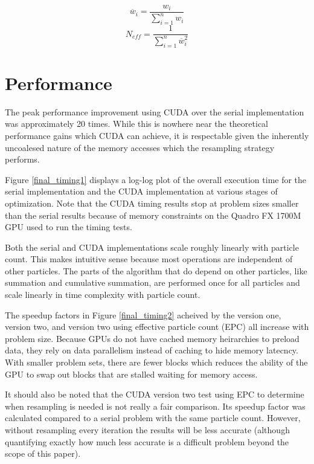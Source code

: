 \documentclass{article}
\begin{document}
\[\overline{w}_{i} = \frac{w_{i}}{\sum_{i=1}^{n} w_{i}}\]
\begin{equation}\label{epc}
N_{eff} = \frac{1}{\sum_{i=1}^{n} \overline{w}_{i}^2}
\end{equation}

\section{Performance}
The peak performance improvement using CUDA over the serial implementation was approximately 20 times. While this is nowhere near the theoretical performance gains which CUDA can achieve, it is respectable given the inherently uncoalesed nature of the memory accesses which the resampling strategy performs.

Figure \ref{final_timing1} displays a log-log plot of the overall execution time for the serial implementation and the CUDA implementation at various stages of optimization. Note that the CUDA timing results stop at problem sizes smaller than the serial results because of memory constraints on the Quadro FX 1700M GPU used to run the timing tests.

Both the serial and CUDA implementations scale roughly linearly with particle count. This makes intuitive sense because most operations are independent of other particles. The parts of the algorithm that do depend on other particles, like summation and cumulative summation, are performed once for all particles and scale linearly in time complexity with particle count.

The speedup factors in Figure \ref{final_timing2} acheived by the version one, version two, and version two using effective particle count (EPC) all increase with problem size. Because GPUs do not have cached memory heirarchies to preload data, they rely on data parallelism instead of caching to hide memory latecncy. With smaller problem sets, there are fewer blocks which reduces the ability of the GPU to swap out blocks that are stalled waiting for memory access.

It should also be noted that the CUDA version two test using EPC to determine when resampling is needed is not really a fair comparison. Its speedup factor was calculated compared to a serial problem with the same particle count. However, without resampling every iteration the results will be less accurate (although quantifying exactly how much less accurate is a difficult problem beyond the scope of this paper).
\end{document}
